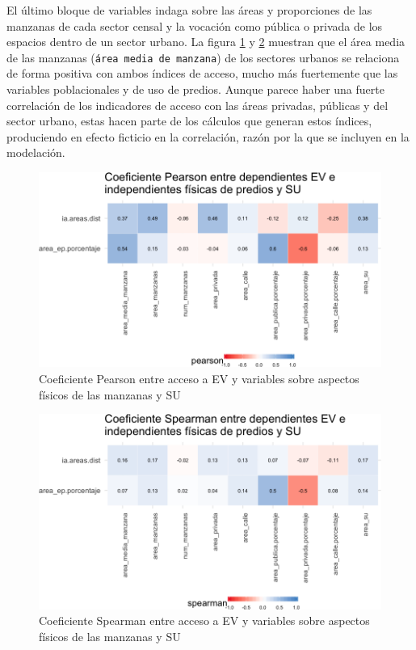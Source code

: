 \documentclass[12pt,a4paper,openany]{book}
\theoremstyle{definition}
\theoremstyle{definition}
\theoremstyle{definition}
\theoremstyle{remark}
\begin{document}
El último bloque de variables indaga sobre las áreas y proporciones de
las manzanas de cada sector censal y la vocación como pública o privada
de los espacios dentro de un sector urbano. La figura
\ref{fig:tile-ev-fisica-pearson} y \ref{fig:tile-ev-fisica-spearman}
muestran que el área media de las manzanas
(\texttt{área\ media\ de\ manzana}) de los sectores urbanos se relaciona
de forma positiva con ambos índices de acceso, mucho más fuertemente que
las variables poblacionales y de uso de predios. Aunque parece haber una
fuerte correlación de los indicadores de acceso con las áreas privadas,
públicas y del sector urbano, estas hacen parte de los cálculos que
generan estos índices, produciendo en efecto ficticio en la correlación,
razón por la que se incluyen en la modelación.

\begin{figure}[H]

{\centering \includegraphics[width=1\linewidth]{tesis-unigis_files/figure-latex/tile-ev-fisica-pearson-1} 

}

\caption{Coeficiente Pearson entre acceso a EV y variables sobre aspectos físicos de las manzanas y SU}\label{fig:tile-ev-fisica-pearson}
\end{figure}

\begin{figure}[H]

{\centering \includegraphics[width=1\linewidth]{tesis-unigis_files/figure-latex/tile-ev-fisica-spearman-1} 

}

\caption{Coeficiente Spearman entre acceso a EV y variables sobre aspectos físicos de las manzanas y SU}\label{fig:tile-ev-fisica-spearman}
\end{figure}
\end{document}
